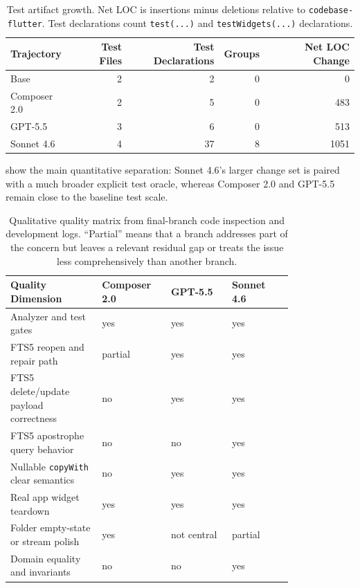 \documentclass[11pt]{article}
\newcommand{\BaseBranch}{\texttt{codebase-\allowbreak flutter}}
\newcommand{\BaseLabel}{Base}
\newcommand{\ComposerLabel}{Composer 2.0}
\newcommand{\GPTLabel}{GPT-5.5}
\newcommand{\SonnetLabel}{Sonnet 4.6}
\newcommand{\ZeroCount}{0}
\newcommand{\BaseTests}{2}
\newcommand{\ComposerTests}{5}
\newcommand{\GPTTests}{6}
\newcommand{\SonnetTests}{37}
\newcommand{\BaseTestFiles}{2}
\newcommand{\ComposerTestFiles}{2}
\newcommand{\GPTTestFiles}{3}
\newcommand{\SonnetTestFiles}{4}
\newcommand{\ComposerNetLoc}{483}
\newcommand{\GPTNetLoc}{513}
\newcommand{\SonnetNetLoc}{1051}
\newcommand{\SonnetGroups}{8}
\begin{document}
\begin{table}[t]
\centering
\small
\begin{tabular}{lrrrr}
\toprule
Trajectory & Test Files & Test Declarations & Groups & Net LOC Change \\
\midrule
\BaseLabel{} & \BaseTestFiles{} & \BaseTests{} & \ZeroCount{} & \ZeroCount{} \\
\ComposerLabel{} & \ComposerTestFiles{} & \ComposerTests{} & \ZeroCount{} & \ComposerNetLoc{} \\
\GPTLabel{} & \GPTTestFiles{} & \GPTTests{} & \ZeroCount{} & \GPTNetLoc{} \\
\SonnetLabel{} & \SonnetTestFiles{} & \SonnetTests{} & \SonnetGroups{} & \SonnetNetLoc{} \\
\bottomrule
\end{tabular}
\caption{Test artifact growth. Net LOC is insertions minus deletions relative to \BaseBranch{}. Test declarations count \texttt{test(...)} and \texttt{testWidgets(...)} declarations.}
\label{tab:test-growth}
\end{table}

 show the main quantitative separation: \SonnetLabel{}'s larger change set is paired with a much broader explicit test oracle, whereas \ComposerLabel{} and \GPTLabel{} remain close to the baseline test scale.

\begin{table}[t]
\centering
\small
\begin{tabular}{L{0.27\linewidth}L{0.18\linewidth}L{0.18\linewidth}L{0.18\linewidth}}
\toprule
Quality Dimension & Composer 2.0 & GPT-5.5 & Sonnet 4.6 \\
\midrule
Analyzer and test gates & yes & yes & yes \\
FTS5 reopen and repair path & partial & yes & yes \\
FTS5 delete/update payload correctness & no & yes & yes \\
FTS5 apostrophe query behavior & no & no & yes \\
Nullable \texttt{copyWith} clear semantics & no & yes & yes \\
Real app widget teardown & yes & yes & yes \\
Folder empty-state or stream polish & yes & not central & partial \\
Domain equality and invariants & no & no & yes \\
\bottomrule
\end{tabular}
\caption{Qualitative quality matrix from final-branch code inspection and development logs. ``Partial'' means that a branch addresses part of the concern but leaves a relevant residual gap or treats the issue less comprehensively than another branch.}
\label{tab:quality-matrix}
\end{table}
\end{document}
